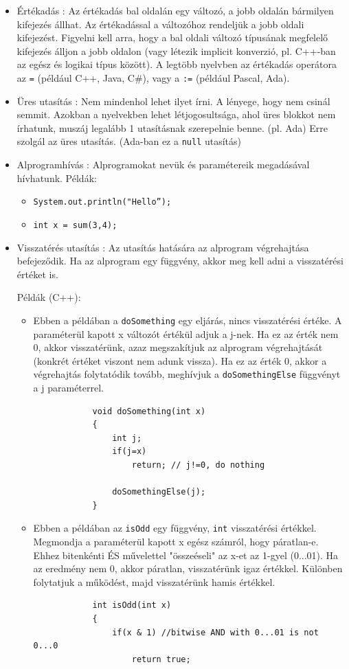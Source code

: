 \documentclass[margin=0px]{article}
\begin{document}
	\begin{itemize}
		\item	Értékadás : Az értékadás bal oldalán egy változó, a jobb oldalán bármilyen kifejezés állhat. Az
		értékadással a változóhoz rendeljük a jobb oldali kifejezést. Figyelni kell arra, hogy a bal oldali
		változó típusának megfelelő kifejezés álljon a jobb oldalon (vagy létezik implicit konverzió, pl. C++-ban
		az egész és logikai típus között). A legtöbb nyelvben az értékadás operátora az \texttt{=} (például C++, Java, C\#),
		vagy a \texttt{:=} (például Pascal, Ada).
	
		\item	Üres utasítás : Nem mindenhol lehet ilyet írni. A lényege, hogy nem csinál semmit.
		Azokban a nyelvekben lehet létjogosultsága,	ahol üres blokkot nem írhatunk,
		muszáj legalább 1 utasításnak szerepelnie benne. (pl. Ada) Erre szolgál az üres utasítás.
		(Ada-ban ez a \texttt{null} utasítás)
		
		\item	Alprogramhívás : Alprogramokat nevük és paramétereik megadásával hívhatunk.
		Példák: 
		\begin{itemize}
			\item	\texttt{System.out.println("Hello”);}
			\item	\texttt{int x = sum(3,4);}
		\end{itemize}
		\item	Visszatérés utasítás : Az utasítás hatására az alprogram végrehajtása befejeződik. Ha az alprogram egy
		függvény, akkor meg kell adni a visszatérési értéket is.
		
		\noindent Példák (C++): 
		\begin{itemize}
			\item	Ebben a példában a \texttt{doSomething} egy eljárás, nincs visszatérési értéke. A paraméterül kapott
			x változót értékül adjuk a j-nek. Ha ez az érték nem 0, akkor visszatérünk, azaz megszakítjuk az alprogram
			végrehajtását (konkrét értéket viszont nem adunk vissza). Ha ez az érték 0, akkor a végrehajtás folytatódik tovább,
			meghívjuk a \texttt{doSomethingElse} függvényt a j paraméterrel.
			\begin{verbatim}
			void doSomething(int x)
			{
			    int j;
			    if(j=x) 
			        return; // j!=0, do nothing
			
			    doSomethingElse(j);
			}
			\end{verbatim}
			
			\item Ebben a példában az \texttt{isOdd} egy függvény, \texttt{int} visszatérési értékkel. Megmondja a paraméterül kapott
			x egész számról, hogy páratlan-e. Ehhez bitenkénti ÉS művelettel "összeéseli" az x-et az 1-gyel (0...01). Ha az eredmény
			nem 0, akkor páratlan, visszatérünk igaz értékkel. Különben folytatjuk a működést, majd visszatérünk hamis értékkel. 
			\begin{verbatim}
			int isOdd(int x)
			{
			    if(x & 1) //bitwise AND with 0...01 is not 0...0
			        return true;
			        

\end{verbatim}
\end{itemize}
\end{itemize}
\end{document}
